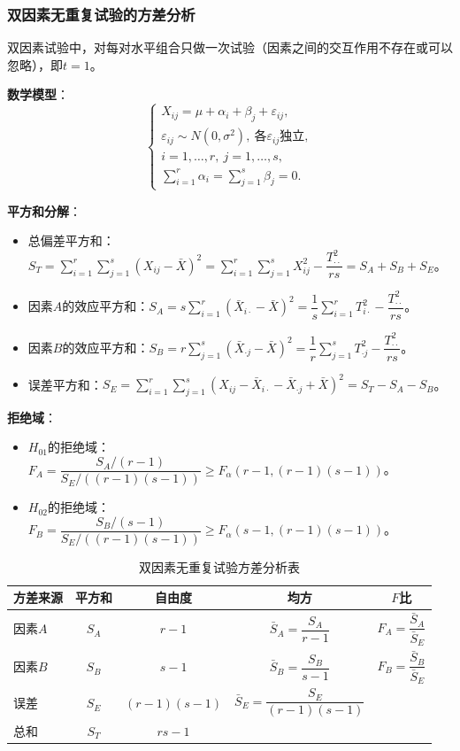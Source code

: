 \documentclass[11pt,a4paper]{report}
\theoremstyle{definition}
\theoremstyle{plain}
\begin{document}
\subsubsection{双因素无重复试验的方差分析}

双因素试验中，对每对水平组合只做一次试验（因素之间的交互作用不存在或可以忽略），即$t=1$。

\textbf{数学模型}：
\[
\begin{cases}
X_{ij}=\mu+\alpha_i+\beta_j+\varepsilon_{ij},\\
\varepsilon_{ij}\sim N(0,\sigma^2),\ \text{各}\varepsilon_{ij}\text{独立},\\
i=1,\ldots,r,\ j=1,\ldots,s,\\
\sum_{i=1}^{r}\alpha_i=\sum_{j=1}^{s}\beta_j=0.
\end{cases}
\]

\textbf{平方和分解}：
\begin{itemize}[leftmargin=2em]
    \item 总偏差平方和：$S_T=\sum_{i=1}^{r}\sum_{j=1}^{s}(X_{ij}-\bar{X})^2=\sum_{i=1}^{r}\sum_{j=1}^{s}X_{ij}^2-\dfrac{T_{\cdot\cdot}^2}{rs}=S_A+S_B+S_E$。
    \item 因素$A$的效应平方和：$S_A=s\sum_{i=1}^{r}(\bar{X}_{i\cdot}-\bar{X})^2=\dfrac{1}{s}\sum_{i=1}^{r}T_{i\cdot}^2-\dfrac{T_{\cdot\cdot}^2}{rs}$。
    \item 因素$B$的效应平方和：$S_B=r\sum_{j=1}^{s}(\bar{X}_{\cdot j}-\bar{X})^2=\dfrac{1}{r}\sum_{j=1}^{s}T_{\cdot j}^2-\dfrac{T_{\cdot\cdot}^2}{rs}$。
    \item 误差平方和：$S_E=\sum_{i=1}^{r}\sum_{j=1}^{s}(X_{ij}-\bar{X}_{i\cdot}-\bar{X}_{\cdot j}+\bar{X})^2=S_T-S_A-S_B$。
\end{itemize}

\textbf{拒绝域}：
\begin{itemize}[leftmargin=2em]
    \item $H_{01}$的拒绝域：$F_A=\dfrac{S_A/(r-1)}{S_E/((r-1)(s-1))}\geq F_\alpha(r-1,(r-1)(s-1))$。
    \item $H_{02}$的拒绝域：$F_B=\dfrac{S_B/(s-1)}{S_E/((r-1)(s-1))}\geq F_\alpha(s-1,(r-1)(s-1))$。
\end{itemize}

\begin{table}[htbp]
\centering
\caption{双因素无重复试验方差分析表}
\begin{tabular}{@{}lcccc@{}}
\toprule
\textbf{方差来源} & \textbf{平方和} & \textbf{自由度} & \textbf{均方} & \textbf{$F$比} \\
\midrule
因素$A$ & $S_A$ & $r-1$ & $\bar{S}_A=\dfrac{S_A}{r-1}$ & $F_A=\dfrac{\bar{S}_A}{\bar{S}_E}$ \\
因素$B$ & $S_B$ & $s-1$ & $\bar{S}_B=\dfrac{S_B}{s-1}$ & $F_B=\dfrac{\bar{S}_B}{\bar{S}_E}$ \\
误差 & $S_E$ & $(r-1)(s-1)$ & $\bar{S}_E=\dfrac{S_E}{(r-1)(s-1)}$ & \\
总和 & $S_T$ & $rs-1$ & & \\
\bottomrule
\end{tabular}
\end{table}
\end{document}
